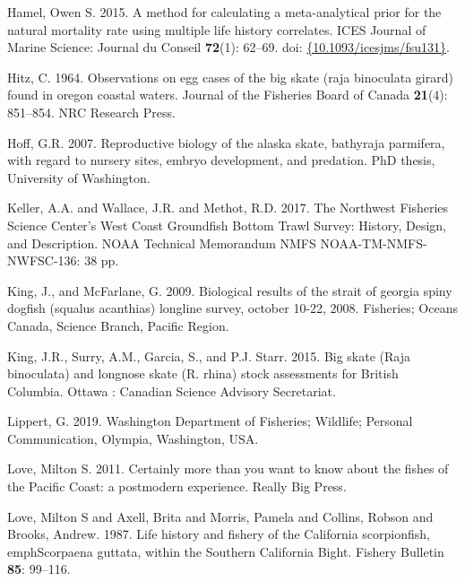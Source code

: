 \documentclass[12pt,]{article}
\begin{document}
\leavevmode\hypertarget{ref-Hamel2015}{}%
Hamel, Owen S. 2015. A method for calculating a meta-analytical prior
for the natural mortality rate using multiple life history correlates.
ICES Journal of Marine Science: Journal du Conseil \textbf{72}(1):
62--69. doi:
\href{https://doi.org/\%7B10.1093/icesjms/fsu131\%7D}{\{10.1093/icesjms/fsu131\}}.

\leavevmode\hypertarget{ref-Hitz1964}{}%
Hitz, C. 1964. Observations on egg cases of the big skate (raja
binoculata girard) found in oregon coastal waters. Journal of the
Fisheries Board of Canada \textbf{21}(4): 851--854. NRC Research Press.

\leavevmode\hypertarget{ref-Hoff2007}{}%
Hoff, G.R. 2007. Reproductive biology of the alaska skate, bathyraja
parmifera, with regard to nursery sites, embryo development, and
predation. PhD thesis, University of Washington.

\leavevmode\hypertarget{ref-Keller2017}{}%
Keller, A.A. and Wallace, J.R. and Methot, R.D. 2017. The Northwest
Fisheries Science Center's West Coast Groundfish Bottom Trawl Survey:
History, Design, and Description. NOAA Technical Memorandum NMFS
NOAA-TM-NMFS-NWFSC-136: 38 pp.

\leavevmode\hypertarget{ref-KingandMcF2009}{}%
King, J., and McFarlane, G. 2009. Biological results of the strait of
georgia spiny dogfish (squalus acanthias) longline survey, october
10-22, 2008. Fisheries; Oceans Canada, Science Branch, Pacific Region.

\leavevmode\hypertarget{ref-King2015}{}%
King, J.R., Surry, A.M., Garcia, S., and P.J. Starr. 2015. Big skate
(Raja binoculata) and longnose skate (R. rhina) stock assessments for
British Columbia. Ottawa : Canadian Science Advisory Secretariat.

\leavevmode\hypertarget{ref-GregLippert}{}%
Lippert, G. 2019. Washington Department of Fisheries; Wildlife; Personal
Communication, Olympia, Washington, USA.

\leavevmode\hypertarget{ref-Love2011}{}%
Love, Milton S. 2011. Certainly more than you want to know about the
fishes of the Pacific Coast: a postmodern experience. Really Big Press.

\leavevmode\hypertarget{ref-Love1987}{}%
Love, Milton S and Axell, Brita and Morris, Pamela and Collins, Robson
and Brooks, Andrew. 1987. Life history and fishery of the California
scorpionfish,\\
emphScorpaena guttata, within the Southern California Bight. Fishery
Bulletin \textbf{85}: 99--116.
\end{document}
